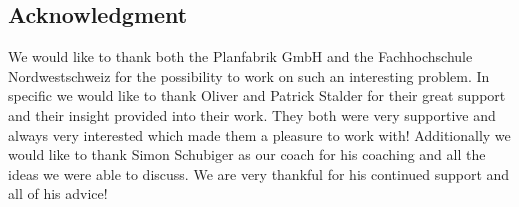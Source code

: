 \subsection{Acknowledgment}
We would like to thank both the Planfabrik GmbH and the Fachhochschule Nordwestschweiz for the possibility to work on such an interesting problem. In specific we would like to thank Oliver and Patrick Stalder for their great support and their insight provided into their work. They both were very supportive and always very interested which made them a pleasure to work with! Additionally we would like to thank Simon Schubiger as our coach for his coaching and all the ideas we were able to discuss. We are very thankful for his continued support and all of his advice!
